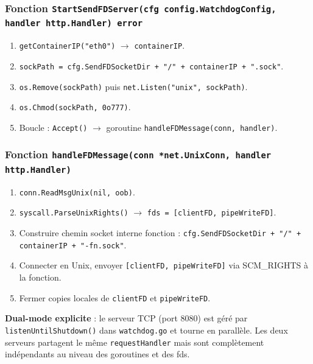 \documentclass[11pt,a4paper]{article}
\begin{document}
\subsubsection{Fonction \texttt{StartSendFDServer(cfg config.WatchdogConfig, handler http.Handler) error}}
\begin{enumerate}
  \item \texttt{getContainerIP("eth0")} $\to$ \texttt{containerIP}.
  \item \texttt{sockPath = cfg.SendFDSocketDir + "/" + containerIP + ".sock"}.
  \item \texttt{os.Remove(sockPath)} puis \texttt{net.Listen("unix", sockPath)}.
  \item \texttt{os.Chmod(sockPath, 0o777)}.
  \item Boucle : \texttt{Accept()} $\to$ goroutine \texttt{handleFDMessage(conn, handler)}.
\end{enumerate}

\subsubsection{Fonction \texttt{handleFDMessage(conn *net.UnixConn, handler http.Handler)}}
\begin{enumerate}
  \item \texttt{conn.ReadMsgUnix(nil, oob)}.
  \item \texttt{syscall.ParseUnixRights()} $\to$ \texttt{fds = [clientFD, pipeWriteFD]}.
  \item Construire chemin socket interne fonction :
    \texttt{cfg.SendFDSocketDir + "/" + containerIP + "-fn.sock"}.
  \item Connecter en Unix, envoyer \texttt{[clientFD, pipeWriteFD]} via SCM\_RIGHTS à la
    fonction.
  \item Fermer copies locales de \texttt{clientFD} et \texttt{pipeWriteFD}.
\end{enumerate}

\textbf{Dual-mode explicite} : le serveur TCP (port 8080) est géré par
\texttt{listenUntilShutdown()} dans \texttt{watchdog.go} et tourne en parallèle.
Les deux serveurs partagent le même \texttt{requestHandler} mais sont complètement
indépendants au niveau des goroutines et des fds.

\end{document}
